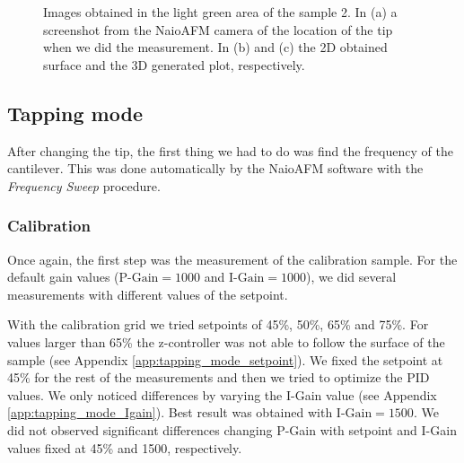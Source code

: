 \documentclass[11pt,a4paper]{article}
\begin{document}
\begin{figure}[H]
\begin{subfigure}[b]{0.45\textwidth}
\caption{}
\end{subfigure}
\caption{Images obtained in the light green area of the sample 2. In (a) a screenshot from the NaioAFM camera of the location of the tip when we did the measurement. In (b) and (c) the 2D obtained surface and the 3D generated plot, respectively.}
\label{fig:sample3_light_green}
\end{figure}

\newpage
\subsection{Tapping mode}
After changing the tip, the first thing we had to do was find the frequency of the cantilever. This was done automatically by the NaioAFM software with the \emph{Frequency Sweep} procedure.

\subsubsection{Calibration}
Once again, the first step was the measurement of the calibration sample. For the default gain values ($\text{P-Gain}=1000$ and $\text{I-Gain}=1000$), we did several measurements with different values of the setpoint.

With the calibration grid we tried setpoints of 45\%, 50\%, 65\% and 75\%. For values larger than 65\% the z-controller was not able to follow the surface of the sample (see Appendix \ref{app:tapping_mode_setpoint}). We fixed the setpoint at 45\% for the rest of the measurements and then we tried to optimize the PID values. We only noticed differences by varying the I-Gain value (see Appendix \ref{app:tapping_mode_Igain}). Best result was obtained with $\text{I-Gain}=1500$. We did not observed significant differences changing P-Gain with setpoint and I-Gain values fixed at 45\% and 1500, respectively.
\end{document}
